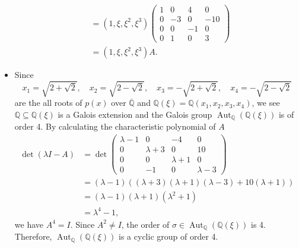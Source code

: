 \begin{solution}
\begin{itemize}
\begin{align*}
			&=\left(1, \xi, \xi^2, \xi^3\right)
			\begin{pmatrix}
				1&0&4&0\\
				0&-3&0&-10\\
				0&0&-1&0\\
				0&1&0&3
			\end{pmatrix}\\
			&=\left(1, \xi, \xi^2, \xi^3\right)A.
		\end{align*}
		\item Since
		\[
			x_1=\sqrt{2+\sqrt{2}},\quad x_2=\sqrt{2-\sqrt{2}},\quad x_3=-\sqrt{2+\sqrt{2}},\quad x_4=-\sqrt{2-\sqrt{2}}
		\]
		are the all roots of $p(x)$ over $\overline{\mathbb{Q}}$ and $\mathbb{Q}(\xi)=\mathbb{Q}(x_1,x_2,x_3,x_4)$, we see $\mathbb{Q}\subseteq\mathbb{Q}(\xi)$ is a Galois extension and the Galois group $\operatorname{Aut}_{\mathbb{Q}}(\mathbb{Q}(\xi))$ is of order 4. By calculating the characteristic polynomial of $A$
		\begin{align*}
			\det\left(\lambda I-A\right)&=\det \begin{pmatrix}
				\lambda-1&0&-4&0\\
				0&\lambda+3&0&10\\
				0&0&\lambda+1&0\\
				0&-1&0&\lambda-3
			\end{pmatrix}\\
			&=(\lambda-1)\left((\lambda+3)(\lambda+1)(\lambda-3)+10(\lambda+1)\right)\\
			&=(\lambda-1)(\lambda+1)\left(\lambda^2+1\right)\\
			&=\lambda^4-1,
		\end{align*}
		we have $A^4=I$. Since $A^2\ne I$, the order of $\sigma\in \operatorname{Aut}_{\mathbb{Q}}(\mathbb{Q}(\xi))$ is 4. Therefore, $\operatorname{Aut}_{\mathbb{Q}}(\mathbb{Q}(\xi))$ is a cyclic group of order 4.
	\end{itemize}
\end{solution}

